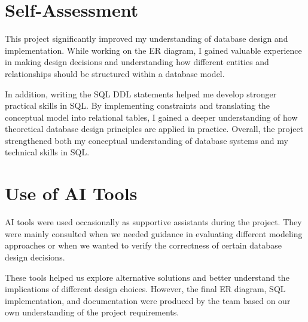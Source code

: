 \documentclass[12pt]{article}
\begin{document}
\section*{Self-Assessment}

This project significantly improved my understanding of database design and implementation. While working on the ER diagram, I gained valuable experience in making design decisions and understanding how different entities and relationships should be structured within a database model.

In addition, writing the SQL DDL statements helped me develop stronger practical skills in SQL. By implementing constraints and translating the conceptual model into relational tables, I gained a deeper understanding of how theoretical database design principles are applied in practice. Overall, the project strengthened both my conceptual understanding of database systems and my technical skills in SQL.

\section*{Use of AI Tools}

AI tools were used occasionally as supportive assistants during the project. They were mainly consulted when we needed guidance in evaluating different modeling approaches or when we wanted to verify the correctness of certain database design decisions.

These tools helped us explore alternative solutions and better understand the implications of different design choices. However, the final ER diagram, SQL implementation, and documentation were produced by the team based on our own understanding of the project requirements.
\end{document}
